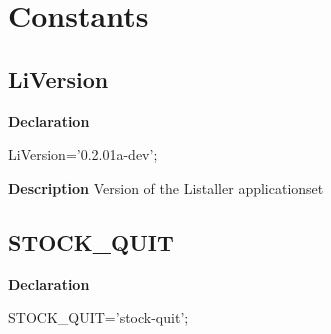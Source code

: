 \documentclass{report}
\newif\ifpdf
\begin{document}
\section{Constants}
\ifpdf
\subsection*{\large{\textbf{LiVersion}}\normalsize\hspace{1ex}\hrulefill}
\else
\subsection*{LiVersion}
\fi
\label{common-LiVersion}
\begin{list}{}{
\setlength{\itemindent}{0cm}
\setlength{\listparindent}{0cm}
\setlength{\leftmargin}{\evensidemargin}
\addtolength{\leftmargin}{\tmplength}
\settowidth{\labelsep}{X}
\addtolength{\leftmargin}{\labelsep}
\setlength{\labelwidth}{\tmplength}
}
\item[\textbf{Declaration}\hfill]
\ifpdf
\begin{flushleft}
\fi
\begin{ttfamily}
LiVersion='0.2.01a-dev';\end{ttfamily}

\ifpdf
\end{flushleft}
\fi

\par
\item[\textbf{Description}]
Version of the Listaller applicationset

\end{list}
\ifpdf
\subsection*{\large{\textbf{STOCK{\_}QUIT}}\normalsize\hspace{1ex}\hrulefill}
\else
\subsection*{STOCK{\_}QUIT}
\fi
\label{common-STOCK_QUIT}
\begin{list}{}{
\setlength{\itemindent}{0cm}
\setlength{\listparindent}{0cm}
\setlength{\leftmargin}{\evensidemargin}
\addtolength{\leftmargin}{\tmplength}
\settowidth{\labelsep}{X}
\addtolength{\leftmargin}{\labelsep}
\setlength{\labelwidth}{\tmplength}
}
\item[\textbf{Declaration}\hfill]
\ifpdf
\begin{flushleft}
\fi
\begin{ttfamily}
STOCK{\_}QUIT='stock-quit';\end{ttfamily}

\ifpdf
\end{flushleft}
\fi

\end{list}
\ifpdf
\end{document}
